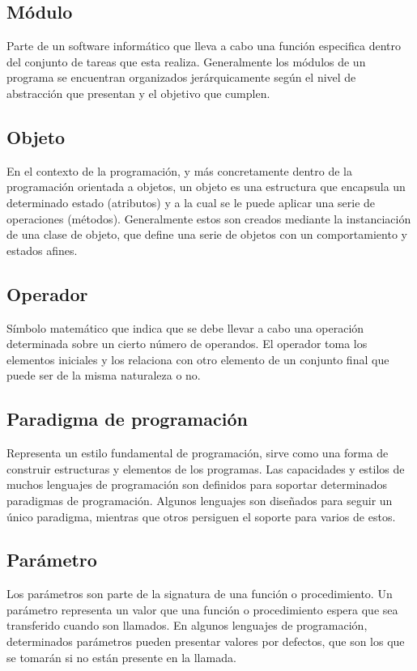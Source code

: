 \subsection {Módulo}
Parte de un software informático que lleva a cabo una función especifica dentro del conjunto de tareas que esta realiza. Generalmente los módulos
de un programa se encuentran organizados jerárquicamente según el nivel de abstracción que presentan y el objetivo que cumplen.\\

\subsection {Objeto}
En el contexto de la programación, y más concretamente dentro de la programación orientada a objetos, un objeto es una estructura que encapsula un determinado estado (atributos) y a la 
cual se le puede aplicar una serie de operaciones (métodos). Generalmente estos son creados mediante la instanciación de una clase de objeto, que define una serie de objetos con un comportamiento y estados afines.\\

\subsection{Operador}
Símbolo matemático que indica que se debe llevar a cabo una operación determinada sobre un cierto número de operandos. 
El operador toma los elementos iniciales y los relaciona con otro elemento de un conjunto final que puede ser de la misma naturaleza o no.\\

\subsection {Paradigma de programación}
Representa un estilo fundamental de programación, sirve como una forma de construir estructuras y elementos de los programas. Las capacidades y estilos de muchos 
lenguajes de programación son definidos para soportar determinados paradigmas de programación. Algunos lenguajes son diseñados para seguir un único paradigma, mientras
que otros persiguen el soporte para varios de estos. \\

\subsection {Parámetro}
Los parámetros son parte de la signatura de una función o procedimiento. Un parámetro representa un valor que una función o procedimiento espera que sea transferido cuando son llamados. En 
algunos lenguajes de programación, determinados parámetros pueden presentar valores por defectos, que son los que se tomarán si no están presente en la llamada.\\

